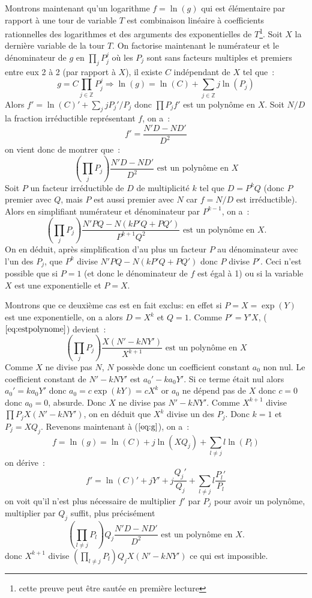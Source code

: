 \documentclass[a4paper,11pt]{article}
\begin{document}
\begin{giacjshere}
Montrons maintenant qu'un logarithme $f=\ln(g)$ qui est élémentaire
par rapport à une tour de variable $T$ est combinaison linéaire à
coefficients rationnelles des logarithmes et des arguments
des exponentielles de $T$\footnote{cette preuve peut être sautée en première
lecture}.
Soit $X$ la dernière variable de la tour $T$.
On factorise maintenant le numérateur et le dénominateur de $g$ en
$\prod_j P_j^j$ où les $P_j$ sont sans facteurs multiples et 
premiers entre eux 2 à 2 (par rapport à $X$), il existe
$C$ indépendant de $X$ tel que~:
\begin{equation} \label{eq:g}
 g=C\prod_{j \in \mathbb{Z}} P_j ^{j} \Rightarrow 
\ln(g)=\ln(C)+\sum_{j \in \mathbb{Z}} j \ln(P_j)
\end{equation}
Alors $f'=\ln(C)'+\sum_j j P_j'/P_j$ donc $\prod P_j f'$ est un 
polynôme en $X$. 
Soit $N/D$ la fraction irréductible représentant $f$, on a~:
\[ f'=\frac{N' D -N D'}{D^2}\]
on vient donc de montrer que~:
\begin{equation} \label{eq:prodpj}
\left(\prod_j P_j \right) \frac{N' D - N D'}{D^2} 
\mbox{ est un polynôme en $X$}
\end{equation}
Soit $P$ un facteur irréductible de $D$ de multiplicité
$k$ tel que $D=P^k Q$ (donc $P$ premier avec $Q$, mais $P$ est aussi
premier avec $N$ car $f=N/D$ est irréductible). Alors en simplifiant
numérateur et dénominateur par $P^{k-1}$, on a~:
\begin{equation} \label{eq:estpolynome}
 \left( \prod_j P_j \right) \frac{N' P Q - N (kP'Q+PQ')}{ P^{k+1} Q^2} 
\mbox{ est un polynôme en $X$.} 
\end{equation}
On en déduit, après simplification d'au plus un facteur $P$ au dénominateur 
avec l'un des $P_j$, que $P^{k}$ divise 
$N' P Q - N (kP'Q+PQ')$ donc $P$ divise $P'$. Ceci n'est possible
que si $P=1$ (et donc le dénominateur de $f$ est égal à 1) 
ou si la variable $X$ est une exponentielle et $P=X$.

Montrons que ce deuxième cas est en fait exclus:
en effet si $P=X=\exp(Y)$ est une exponentielle, on a alors 
$D=X^k$ et $Q=1$.
Comme $P'=Y'X$, (\(\ref{eq:estpolynome}\)) devient~:
\[ \left( \prod_j P_j \right) \frac{X (N' - k N Y' )}{X^{k+1}}
\mbox{ est un polynôme en $X$} \]
Comme $X$ ne divise pas $N$, $N$ possède donc un coefficient constant 
$a_0$ non nul. Le coefficient constant de $N'-kNY'$ est $a_0'-ka_0 Y'$. 
Si ce terme était nul alors $a_0'=ka_0 Y'$ donc $a_0=c \exp(kY)=cX^k$ 
or $a_0$ ne dépend pas de $X$ donc $c=0$ donc $a_0=0$, absurde. 
Donc $X$ ne divise pas $N'-kNY'$.
Comme $X^{k+1}$ divise $ \prod P_j X (N' - k N Y' )$, on en déduit que
$X^k$ divise un des $P_j$. Donc $k=1$ et $P_j=XQ_j$. 
Revenons maintenant à (\(\ref{eq:g}\)), on a~:
\[  f=\ln(g) = \ln(C)+j \ln(XQ_j)+ \sum_{l \neq j} l \ln(P_l) \]
on dérive~:
\[ f'=\ln(C)'+jY'+j\frac{Q_j'}{Q_j}+\sum_{l \neq j} l \frac{P_l'}{P_l}\]
on voit qu'il n'est plus nécessaire de multiplier $f'$ par $P_j$
pour avoir un polynôme, multiplier par $Q_j$ suffit, plus précisément
\[ 
\left( \prod_{l \neq j} P_l \right) Q_j \frac{N' D - N D'}{D^2} 
\mbox{ est un polynôme en $X$.} 
\]
donc $X^{k+1}$ divise  
$ \left(\prod_{l \neq j}P_l \right) Q_j X (N' - k N Y' )$ 
ce qui est impossible.


\end{giacjshere}
\end{document}
